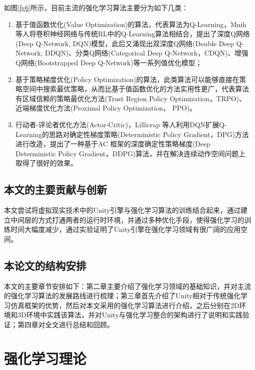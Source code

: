 \documentclass[bachelor]{thesis-uestc}
\begin{document}
	如图\ref{fg6}所示，目前主流的强化学习算法主要分为如下几类：
	\begin{enumerate}
		\item 基于值函数优化(Value Optimization)的算法，代表算法为Q-Learning，Mnih 等人\cite{mnih2015human}将卷积神经网络与传统RL中的Q-Learning算法相结合，提出了深度Q网络(Deep Q-Network, DQN)模型，此后又涌现出双深度Q网络\cite{van2016deep}(Double Deep Q-Network, DDQN)、分类Q网络\cite{bellemare2017distributional}(Categorical Deep Q-Network，CDQN)、增强Q网络\cite{osband2016deep}(Bootstrapped Deep Q-Network)等一系列值优化模型；
		
		\item 基于策略梯度优化(Policy Optimization)的算法，此类算法可以能够直接在策略空间中搜索最优策略，从而比基于值函数优化的方法实用性更广，代表算法有区域信赖的策略最优化方法\cite{Schulman2015Trust}(Trust Region Policy Optimization，TRPO)、近端梯度优化方法\cite{Schulman2017Proximal}(Proximal Policy Optimization， PPO)。
		
		\item 行动者-评论者优化方法(Actor-Critic)，Lillicrap 等人\cite{lillicrap2015continuous}利用DQN扩展Q-Learning的思路对确定性梯度策略(Deterministic Policy Gradient，DPG)方法进行改造，提出了一种基于AC 框架的深度确定性策略梯度(Deep Deterministic Policy Gradient，DDPG)算法，并在解决连续动作空间问题上取得了很好的效果。
	\end{enumerate}
	
	\section{本文的主要贡献与创新}
	本文尝试将虚拟现实技术中的Unity引擎与强化学习算法的训练结合起来，通过建立中间层的方式打通两者的运行时环境，并通过多种优化手段，使得强化学习的训练时间大幅度减少，通过实验证明了Unity引擎在强化学习领域有很广阔的应用空间。
	
	\section{本论文的结构安排}
	本文的主要章节安排如下：第二章主要介绍了强化学习领域的基础知识，并对主流的强化学习算法的发展路线进行梳理；第三章首先介绍了Unity相对于传统强化学习仿真框架的优势，然后对本文采用的强化学习算法进行介绍，之后分别在2D环境和3D环境中实践该算法，并对Unity与强化学习整合的架构进行了说明和实践验证；第四章对全文进行总结和回顾。
	
	\chapter{强化学习理论}
\end{document}
